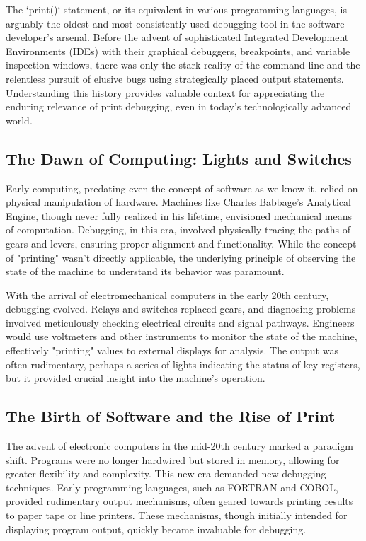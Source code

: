 \documentclass{article}
\begin{document}
The `print()` statement, or its equivalent in various programming languages, is arguably the oldest and most consistently used debugging tool in the software developer's arsenal. Before the advent of sophisticated Integrated Development Environments (IDEs) with their graphical debuggers, breakpoints, and variable inspection windows, there was only the stark reality of the command line and the relentless pursuit of elusive bugs using strategically placed output statements. Understanding this history provides valuable context for appreciating the enduring relevance of print debugging, even in today's technologically advanced world.

\subsection*{The Dawn of Computing: Lights and Switches}

Early computing, predating even the concept of software as we know it, relied on physical manipulation of hardware. Machines like Charles Babbage's Analytical Engine, though never fully realized in his lifetime, envisioned mechanical means of computation. Debugging, in this era, involved physically tracing the paths of gears and levers, ensuring proper alignment and functionality. While the concept of "printing" wasn't directly applicable, the underlying principle of observing the state of the machine to understand its behavior was paramount.

With the arrival of electromechanical computers in the early 20th century, debugging evolved. Relays and switches replaced gears, and diagnosing problems involved meticulously checking electrical circuits and signal pathways. Engineers would use voltmeters and other instruments to monitor the state of the machine, effectively "printing" values to external displays for analysis. The output was often rudimentary, perhaps a series of lights indicating the status of key registers, but it provided crucial insight into the machine's operation.

\subsection*{The Birth of Software and the Rise of Print}

The advent of electronic computers in the mid-20th century marked a paradigm shift. Programs were no longer hardwired but stored in memory, allowing for greater flexibility and complexity. This new era demanded new debugging techniques. Early programming languages, such as FORTRAN and COBOL, provided rudimentary output mechanisms, often geared towards printing results to paper tape or line printers. These mechanisms, though initially intended for displaying program output, quickly became invaluable for debugging.
\end{document}
